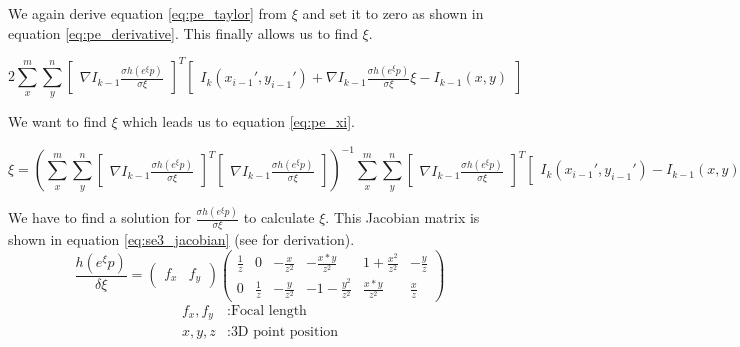 \documentclass[11pt,a4paper,titlepage,oneside]{report}
\begin{document}
We again derive equation \ref{eq:pe_taylor} from $\xi$ and set it to zero as shown in equation \ref{eq:pe_derivative}. This finally allows us to find $\xi$.

\begin{equation}\label{eq:pe_derivative}
  2\sum_x^m\sum_y^n\begin{bmatrix}\nabla I_{k-1}\frac{\sigma h(e^{\xi}p)}{\sigma \xi}\end{bmatrix}^T\begin{bmatrix}I_{k}(x_{i-1}',y_{i-1}')+\nabla I_{k-1}\frac{\sigma h(e^{\xi} p)}{\sigma \xi}\xi-I_{k-1}(x,y)\end{bmatrix}
\end{equation}

We want to find $\xi$ which leads us to equation \ref{eq:pe_xi}.

\tiny
\begin{equation}\label{eq:pe_xi}
  \xi=(\sum_x^m\sum_y^n\begin{bmatrix}\nabla I_{k-1}\frac{\sigma h(e^{\xi}p)}{\sigma \xi}\end{bmatrix}^T\begin{bmatrix}\nabla I_{k-1}\frac{\sigma h(e^{\xi}p)}{\sigma \xi}\end{bmatrix})^{-1}
  \sum_x^m\sum_y^n\begin{bmatrix}\nabla I_{k-1}\frac{\sigma h(e^{\xi}p)}{\sigma \xi}\end{bmatrix}^T\begin{bmatrix}I_{k}(x_{i-1}',y_{i-1}') - I_{k-1}(x,y)\end{bmatrix}
\end{equation}
\normalsize

We have to find a solution for $\frac{\sigma h(e^{\xi}p)}{\sigma \xi}$ to calculate $\xi$. This Jacobian matrix is shown in equation \ref{eq:se3_jacobian} (see \cite{se3_explain} for derivation).
\begin{equation}\label{eq:se3_jacobian}
  \frac{h(e^{\xi}p)}{\delta \xi}=
  \begin{pmatrix}
    f_x & f_y
  \end{pmatrix}
  \begin{pmatrix}
    \frac{1}{z} & 0 & -\frac{x}{z^2} & -\frac{x*y}{z^2} & 1 + \frac{x^2}{z^2} & -\frac{y}{z} \\
    0 & \frac{1}{z}  & -\frac{y}{z^2} & -1 - \frac{y^2}{z^2} & \frac{x*y}{z^2} &  \frac{x}{z}
  \end{pmatrix}
\end{equation}
\begin{align*}
  f_x,f_y  &:  \text{Focal length}\\
  x,y,z    &:  \text{3D point position}\\
\end{align*}
\end{document}
